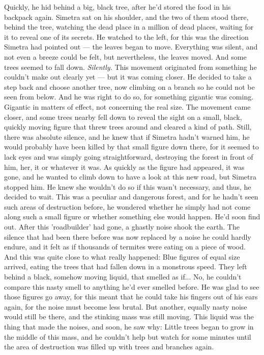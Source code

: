 Quickly, he hid behind a big, black tree, after he'd stored the food in his backpack again. Simetra sat on his shoulder, and the two of them stood there, behind the tree, watching the dead place in a million of dead places, waiting for it to reveal one of its secrets. 
He watched to the left, for this was the direction Simetra had pointed out --- the leaves began to move. 
Everything was silent, and not even a breeze could be felt, but nevertheless, the leaves moved. 
And some trees seemed to fall down. \emph{Silently.}
This movement originated from something he couldn't make out clearly yet --- but it was coming closer. 
He decided to take a step back and choose another tree, now climbing on a branch so he could not be seen from below. 
And he was right to do so, for something gigantic was coming. Gigantic in matters of effect, not concerning the real size. 
The movement came closer, and some trees nearby fell down to reveal the sight on a small, black, quickly moving figure that threw trees around and cleared a kind of path. Still, there was absolute silence, and he knew that if Simetra hadn't warned him, he would probably have been killed by that small figure down there, for it seemed to lack eyes and was simply going straightforward, destroying the forest in front of him, her, it or whatever it was. As quickly as the figure had appeared, it was gone, and he wanted to climb down to have a look at this new road, but Simetra stopped him. 
He knew she wouldn't do so if this wasn't necessary, and thus, he decided to wait. This was a peculiar and dangerous forest, and for he hadn't seen such areas of destruction before, he wondered whether he simply had not come along such a small figure or whether something else would happen. 
He'd soon find out. 
After this 'roadbuilder' had gone, a ghastly noise shook the earth. The silence that had been there before was now replaced by a noise he could hardly endure, and it felt as if thousands of termites were eating on a piece of wood. 
And this was quite close to what really happened: Blue figures of equal size arrived, eating the trees that had fallen down in a monstrous speed. They left behind a black, somehow moving liquid, that smelled as if...
No, he couldn't compare this nasty smell to anything he'd ever smelled before. He was glad to see those figures go away, for this meant that he could take his fingers out of his ears again, for the noise must become less brutal. 
But another, equally nasty noise would still be there, and the stinking mass was still moving. This liquid was the thing that made the noises, and soon, he saw why: Little trees began to grow in the middle of this mass, and he couldn't help but watch for some minutes until the area of destruction was filled up with trees and branches again. 
